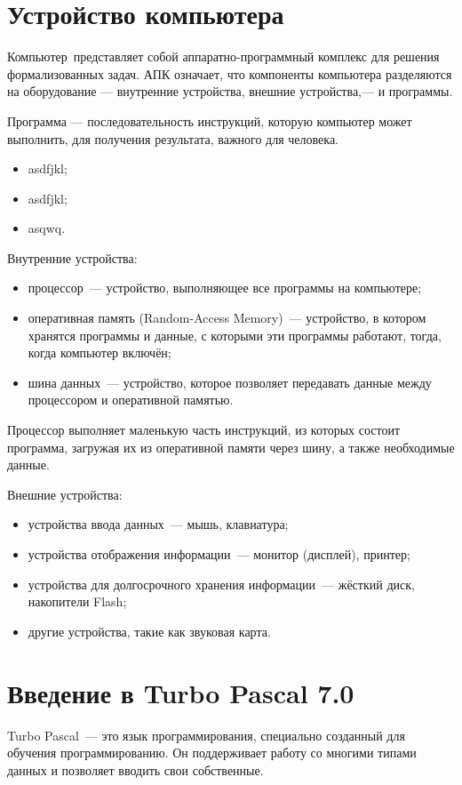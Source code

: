 \documentclass[12pt,russian]{article}
\begin{document}
\section{Устройство компьютера}
Компьютер представляет собой аппаратно-программный комплекс для решения
формализованных задач. АПК означает, что компоненты компьютера разделяются на
оборудование --- внутренние устройства, внешние устройства,--- и программы.

Программа --- последовательность инструкций, которую компьютер может выполнить,
для получения результата, важного для человека.

\begin{itemize}
    \item asdfjkl;
    \item asdfjkl;
    \item asqwq.
\end{itemize}
Внутренние устройства:
\vspace{-\topsep}
\begin{itemize}
\setlength{\parskip}{0pt}
\setlength{\itemsep}{0pt plus 1pt}
\item{процессор — устройство, выполняющее все программы на
компьютере;}
\item{оперативная память (Random-Access Memory) — устройство, в котором
хранятся программы и данные, с которыми эти программы работают, тогда, когда
компьютер включён;}
\item{шина данных — устройство, которое позволяет передавать
данные между процессором и оперативной памятью.}
\end{itemize}

Процессор выполняет маленькую
часть инструкций, из которых состоит программа, загружая их из оперативной
памяти через шину, а также необходимые данные.

Внешние устройства:
\vspace{-\topsep}
\begin{itemize}
\setlength{\parskip}{0pt}
\setlength{\itemsep}{0pt plus 1pt}
\item{устройства ввода данных — мышь, клавиатура;}
\item{устройства отображения информации — монитор (дисплей), принтер;}
\item{устройства для долгосрочного хранения информации — жёсткий диск, накопители Flash;}
\item{другие устройства, такие как звуковая карта.}
\end{itemize}

\section{Введение в Turbo Pascal 7.0}
Turbo Pascal~--- это язык
программирования, специально созданный для обучения программированию. Он
поддерживает работу со многими типами данных и позволяет вводить свои
собственные.
\end{document}
